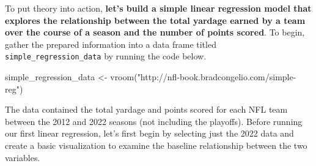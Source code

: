 \documentclass[
  letterpaper,
]{krantz}
\newenvironment{Shaded}{\begin{snugshade}}{\end{snugshade}}
\newcommand{\FunctionTok}[1]{\textcolor[rgb]{0.28,0.35,0.67}{#1}}
\newcommand{\NormalTok}[1]{\textcolor[rgb]{0.00,0.23,0.31}{#1}}
\newcommand{\OtherTok}[1]{\textcolor[rgb]{0.00,0.23,0.31}{#1}}
\newcommand{\StringTok}[1]{\textcolor[rgb]{0.13,0.47,0.30}{#1}}
\begin{document}
To put theory into action, \textbf{let's build a simple linear
regression model that explores the relationship between the total
yardage earned by a team over the course of a season and the number of
points scored}. To begin, gather the prepared information into a data
frame titled \texttt{simple\_regression\_data} by running the code
below.

\begin{Shaded}
\begin{Highlighting}[]
\NormalTok{simple\_regression\_data }\OtherTok{\textless{}{-}} \FunctionTok{vroom}\NormalTok{(}\StringTok{"http://nfl{-}book.bradcongelio.com/simple{-}reg"}\NormalTok{)}
\end{Highlighting}
\end{Shaded}

The data contained the total yardage and points scored for each NFL team
between the 2012 and 2022 seasons (not including the playoffs). Before
running our first linear regression, let's first begin by selecting just
the 2022 data and create a basic visualization to examine the baseline
relationship between the two variables.
\end{document}
